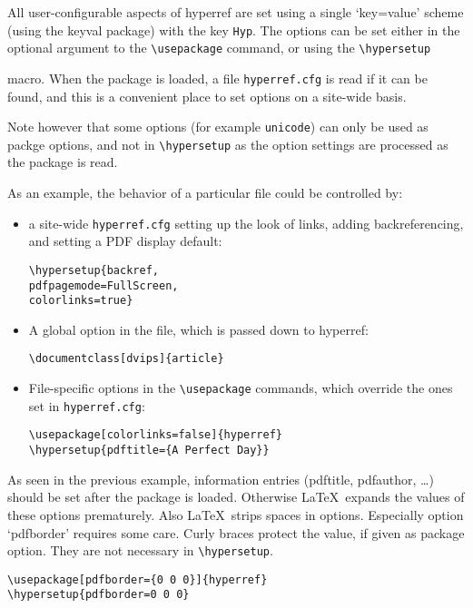 \documentclass[pdftex]{article}
\newcommand*{\cs}[1]{%
  \texttt{\textbackslash #1}%
}
\newcommand*{\xpackage}[1]{\textsf{#1}}
\begin{document}
All user-configurable aspects of \xpackage{hyperref} are set using a
single `key=value' scheme (using the \xpackage{keyval} package) with the
key \texttt{Hyp}. The options can be set either in the optional argument
to the \cs{usepackage} command, or using the \cs{hypersetup}
macro. When the package is loaded, a file \texttt{hyperref.cfg} is read
if it can be found, and this is a convenient place to set options on a
site-wide basis.

Note however that some options (for example \texttt{unicode}) can only be used as
packge options, and not in \verb|\hypersetup| as the option settings are processed
as the package is read.

As an example, the behavior of a particular file could be controlled by:
\begin{itemize}

\item	a site-wide \texttt{hyperref.cfg} setting up the look of links,
adding backreferencing, and setting a PDF display default:

\begin{verbatim}
\hypersetup{backref,
pdfpagemode=FullScreen,
colorlinks=true}
\end{verbatim}

\item	A global option in the file, which is passed down to
\textsf{hyperref}:

\begin{verbatim}
\documentclass[dvips]{article}
\end{verbatim}

\item	File-specific options in the \cs{usepackage} commands, which
override the ones set in \texttt{hyperref.cfg}:

\begin{verbatim}
\usepackage[colorlinks=false]{hyperref}
\hypersetup{pdftitle={A Perfect Day}}
\end{verbatim}
\end{itemize}

As seen in the previous example, information entries
(pdftitle, pdfauthor, \dots) should be set after the package is loaded.
Otherwise \LaTeX\ expands the values of these options prematurely.
Also \LaTeX\ strips spaces in options. Especially option `pdfborder'
requires some care. Curly braces protect the value, if given
as package option. They are not necessary in \verb|\hypersetup|.

\begin{verbatim}
\usepackage[pdfborder={0 0 0}]{hyperref}
\hypersetup{pdfborder=0 0 0}
\end{verbatim}
\end{document}
